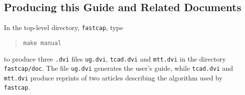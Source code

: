 \subsection{Producing this Guide and Related Documents}

In the top-level directory, {\tt fastcap}, type
\begin{quote}
\begin{verbatim}
make manual
\end{verbatim}
\end{quote}
to produce three {\tt .dvi} files {\tt ug.dvi}, 
{\tt tcad.dvi} and {\tt mtt.dvi} in the directory {\tt fastcap/doc}.
The file {\tt ug.dvi} generates
the user's guide, while {\tt tcad.dvi} and {\tt mtt.dvi}
produce reprints of two articles describing the algorithm
used by {\tt fastcap}.

